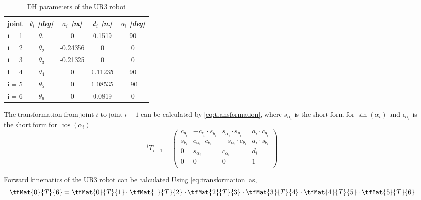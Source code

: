 \begin{table}[htbp]
	\begin{center}
		\begin{tabular}{|c|c|c|c|c|}
			\hline
			\cline{2-5} 
			\textbf{joint} & \textbf{\textit{$\theta_{i}$ [deg]}}& \textbf{\textit{$a_{i}$ [m]}}& \textbf{\textit{$d_{i}$ [m]}} & \textbf{\textit{$\alpha_{i}$ [deg]}}\\
			\hline
			i = 1& $\theta_{1}$& 0& 0.1519& 90 \\
			i = 2& $\theta_{2}$& -0.24356& 0& 0 \\
			i = 3& $\theta_{3}$& -0.21325& 0& 0 \\
			i = 4& $\theta_{4}$& 0& 0.11235& 90 \\
			i = 5& $\theta_{5}$& 0& 0.08535& -90 \\
			i = 6& $\theta_{6}$& 0& 0.0819& 0 \\
			\hline
		\end{tabular}
		\caption{DH parameters of the UR3 robot}
		\label{tab:DH_values}
	\end{center}
\end{table}

\noindent The transformation from joint $i$ to joint $i-1$ can be calculated by \ref{eq:transformation}, where $s_{\alpha_{i}}$ is the short form for $\sin(\alpha_{i})$ and $c_{\alpha_{i}}$ is the short form for $\cos(\alpha_{i})$
\begin{equation}
{}^{i}{T}_{i-1} = \left( \begin{array}{rrrr}                                
c_{\theta_{i}} & -c_{\theta_{i}} \cdot s_{\theta_{i}} & s_{\alpha_{i}} \cdot s_{\theta_{i}} & a_{i} \cdot c_{\theta_{i}} \\                                               
s_{\theta_{i}} & c_{\alpha_{i}} \cdot c_{\theta_{i}} & -s_{\alpha_{i}} \cdot c_{\theta_{i}} &  a_{i} \cdot s_{\theta_{i}} \\                                               
0 & s_{\alpha_{i}} & c_{\alpha_{i}} & d_{i} \\
0 & 0 & 0 & 1 \\                                               
\end{array}\right)
\label{eq:transformation}
\end{equation}

\noindent Forward kinematics of the UR3 robot can be calculated Using \ref{eq:transformation} as,  
\begin{equation*}
\tfMat{0}{T}{6} =\tfMat{0}{T}{1} \cdot \tfMat{1}{T}{2} \cdot \tfMat{2}{T}{3} \cdot \tfMat{3}{T}{4} \cdot \tfMat{4}{T}{5} \cdot \tfMat{5}{T}{6}
\end{equation*}


